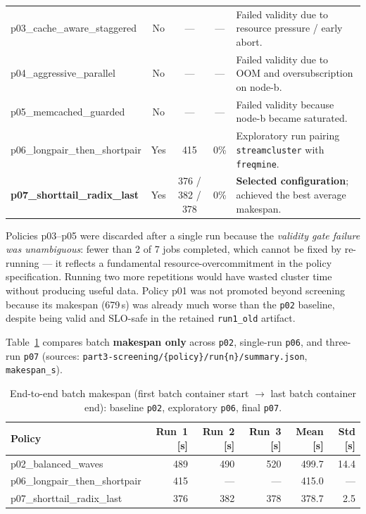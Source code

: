 \begin{enumerate}
\begin{enumerate}
\begin{table}[htbp]
\begin{tabular}{lccc p{5.2cm}}
p03\_cache\_aware\_staggered
& No & --- & ---
& Failed validity due to resource pressure / early abort. \\

p04\_aggressive\_parallel
& No & --- & ---
& Failed validity due to OOM and oversubscription on node-b. \\

p05\_memcached\_guarded
& No & --- & ---
& Failed validity because node-b became saturated. \\

p06\_longpair\_then\_shortpair
& Yes & 415 & 0\%
& Exploratory run pairing \texttt{streamcluster} with \texttt{freqmine}. \\

\textbf{p07\_shorttail\_radix\_last}
& Yes & 376 / 382 / 378 & 0\%
& \textbf{Selected configuration}; achieved the best average makespan. \\

\bottomrule
\end{tabular}
\end{table}

\noindent
Policies p03--p05 were discarded after a single run because the
\emph{validity gate failure was unambiguous}: fewer than 2 of 7 jobs
completed, which cannot be fixed by re-running --- it reflects a
fundamental resource-overcommitment in the policy specification.
Running two more repetitions would have wasted cluster time without
producing useful data.
Policy p01 was not promoted beyond screening because its makespan
(679\,s) was already much worse than the \texttt{p02} baseline, despite being
valid and SLO-safe in the retained \texttt{run1\_old} artifact.

Table~\ref{tabmakespancompare} compares batch \textbf{makespan only} across
\texttt{p02}, single-run \texttt{p06}, and three-run \texttt{p07}
(sources: \texttt{part3-screening/\{policy\}/run\{n\}/summary.json},
\texttt{makespan\_s}).

\begin{table}[htbp]
\centering
\small
\caption{End-to-end batch makespan (first batch container start $\to$ last
  batch container end): baseline \texttt{p02}, exploratory \texttt{p06},
  final \texttt{p07}.}
\label{tabmakespancompare}
\begin{tabular}{lrrrrr}
\toprule
\textbf{Policy} & \textbf{Run~1 [s]} & \textbf{Run~2 [s]} & \textbf{Run~3 [s]}
  & \textbf{Mean [s]} & \textbf{Std [s]} \\
\midrule
p02\_balanced\_waves           & 489 & 490 & 520 & 499.7 & 14.4 \\
p06\_longpair\_then\_shortpair & 415 & --- & --- & 415.0 & --- \\
p07\_shorttail\_radix\_last    & 376 & 382 & 378 & 378.7 & 2.5 \\
\bottomrule
\end{tabular}
\end{table}


\end{enumerate}
\end{enumerate}
